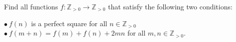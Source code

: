 Find all functions $f:\mathbb{Z}_{>0}\rightarrow\mathbb{Z}_{>0}$ that satisfy the following two conditions:

$\bullet\ f(n)$ is a perfect square for all $n\in\mathbb{Z}_{>0}$$\bullet\ f(m+n)=f(m)+f(n)+2mn$ for all $m,n\in\mathbb{Z}_{>0}$.